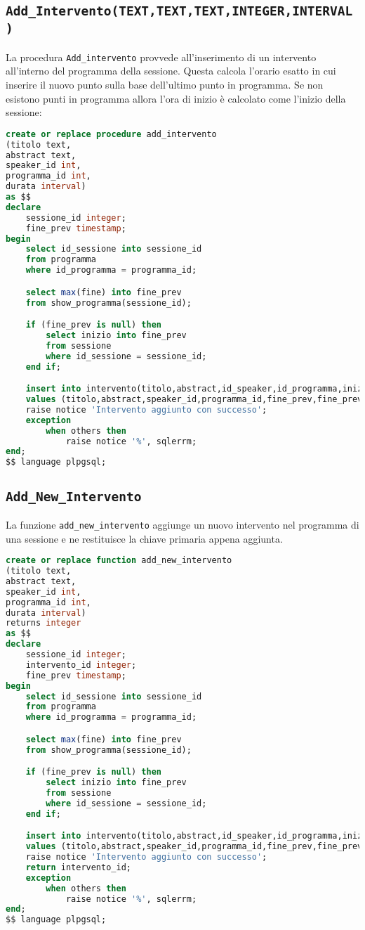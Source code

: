 \subsection{\texttt{Add\_Intervento(TEXT,TEXT,TEXT,INTEGER,INTERVAL)}}
La procedura \texttt{Add\_intervento} provvede all'inserimento di un intervento all'interno del programma della sessione. Questa calcola l'orario esatto in cui inserire il nuovo punto sulla base dell'ultimo punto in programma. Se non esistono punti in programma allora l'ora di inizio è calcolato come l'inizio della sessione:
\begin{lstlisting}[language=SQL,style=mystyle]
create or replace procedure add_intervento
(titolo text, 
abstract text, 
speaker_id int, 
programma_id int,
durata interval)
as $$
declare
    sessione_id integer;
    fine_prev timestamp;
begin
    select id_sessione into sessione_id
    from programma
    where id_programma = programma_id;

    select max(fine) into fine_prev
    from show_programma(sessione_id);

    if (fine_prev is null) then
        select inizio into fine_prev
        from sessione
        where id_sessione = sessione_id;
    end if;

    insert into intervento(titolo,abstract,id_speaker,id_programma,inizio,fine)
    values (titolo,abstract,speaker_id,programma_id,fine_prev,fine_prev+durata);
    raise notice 'Intervento aggiunto con successo';
    exception
        when others then
            raise notice '%', sqlerrm;
end;
$$ language plpgsql;
\end{lstlisting}

\subsection{\texttt{Add\_New\_Intervento}}
La funzione \texttt{add\_new\_intervento} aggiunge un nuovo intervento nel programma di una sessione e ne restituisce la chiave primaria appena aggiunta.
\begin{lstlisting}[language=SQL,style=mystyle]
create or replace function add_new_intervento 
(titolo text, 
abstract text, 
speaker_id int, 
programma_id int,
durata interval)
returns integer
as $$
declare
    sessione_id integer;
    intervento_id integer;
    fine_prev timestamp;
begin
    select id_sessione into sessione_id
    from programma
    where id_programma = programma_id;

    select max(fine) into fine_prev
    from show_programma(sessione_id);

    if (fine_prev is null) then
        select inizio into fine_prev
        from sessione
        where id_sessione = sessione_id;
    end if;

    insert into intervento(titolo,abstract,id_speaker,id_programma,inizio,fine)
    values (titolo,abstract,speaker_id,programma_id,fine_prev,fine_prev+durata) returning id_intervento into intervento_id;
    raise notice 'Intervento aggiunto con successo';
    return intervento_id;
    exception
        when others then
            raise notice '%', sqlerrm;
end;
$$ language plpgsql;
\end{lstlisting}
